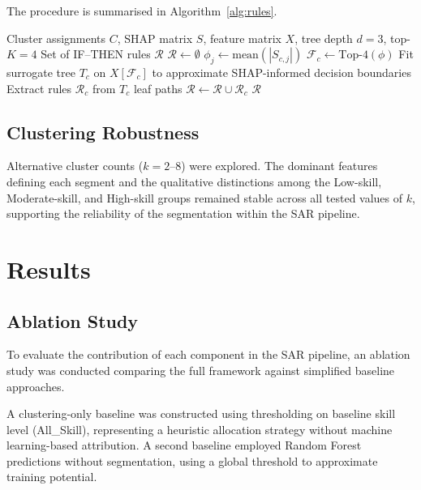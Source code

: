 \documentclass[3p,twocolumn,authoryear]{elsarticle}
\begin{document}
The procedure is summarised in Algorithm~\ref{alg:rules}.

\begin{algorithm}
\caption{SHAP-guided Surrogate Rule Extraction}
\label{alg:rules}
\begin{algorithmic}[1]
\Require Cluster assignments $C$, SHAP matrix $S$,
         feature matrix $X$, tree depth $d = 3$, top-$K = 4$
\Ensure Set of IF--THEN rules $\mathcal{R}$
\State $\mathcal{R} \gets \emptyset$
    \State $\phi_j \gets \text{mean}(|S_{c,j}|)$
    \State $\mathcal{F}_c \gets \text{Top-}4(\phi)$
    \State Fit surrogate tree $T_c$ on $X[\mathcal{F}_c]$
           to approximate SHAP-informed decision boundaries
    \State Extract rules $\mathcal{R}_c$ from $T_c$ leaf paths
    \State $\mathcal{R} \gets \mathcal{R} \cup \mathcal{R}_c$
\EndFor
\State \Return $\mathcal{R}$
\end{algorithmic}
\end{algorithm}

\subsection{Clustering Robustness}

Alternative cluster counts ($k = 2$--$8$) were explored.
The dominant features defining each segment and the qualitative
distinctions among the Low-skill, Moderate-skill, and High-skill groups
remained stable across all tested values of $k$, supporting the
reliability of the segmentation within the SAR pipeline.

\section{Results}
\subsection{Ablation Study}

To evaluate the contribution of each component in the SAR pipeline,
an ablation study was conducted comparing the full framework against
simplified baseline approaches.

A clustering-only baseline was constructed using thresholding on
baseline skill level (All\_Skill), representing a heuristic allocation
strategy without machine learning-based attribution.
A second baseline employed Random Forest predictions without
segmentation, using a global threshold to approximate training
potential.
\end{document}
